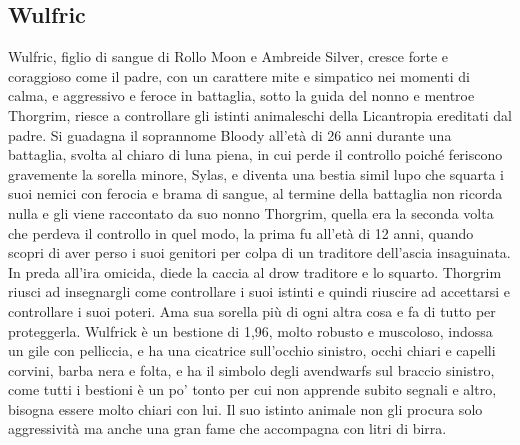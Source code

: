 \documentclass{article}
\begin{document}
          \subsection{Wulfric}
Wulfric, figlio di sangue  di Rollo Moon e Ambreide Silver, cresce forte e coraggioso come il padre, con un carattere mite e simpatico nei momenti di calma, e aggressivo e feroce in battaglia, sotto la guida del nonno e mentroe Thorgrim, riesce a controllare gli istinti animaleschi della Licantropia ereditati dal padre. Si guadagna il soprannome  Bloody all'età di 26 anni durante una battaglia, svolta al chiaro di luna piena, in cui perde il controllo poiché feriscono gravemente la sorella minore, Sylas,  e diventa una bestia simil lupo che squarta i suoi nemici con ferocia e brama di sangue, al termine della battaglia non ricorda nulla e gli viene raccontato da suo nonno Thorgrim, quella era la seconda volta che perdeva il controllo in quel modo, la prima fu all'età di 12 anni, quando scopri di aver perso i suoi genitori per colpa di un traditore dell'ascia insaguinata. In preda all'ira omicida, diede la caccia al drow traditore e lo squarto. Thorgrim riusci ad insegnargli come controllare i suoi istinti e quindi riuscire ad accettarsi e controllare i suoi poteri. Ama sua sorella più di ogni altra cosa e fa di tutto per proteggerla. Wulfrick è un bestione di 1,96, molto robusto e muscoloso, indossa un gile con pelliccia, e ha una cicatrice sull'occhio sinistro, occhi chiari e capelli corvini, barba nera e folta, e ha il simbolo degli avendwarfs sul braccio sinistro, come tutti i bestioni è un po' tonto per cui non apprende subito segnali e altro, bisogna essere molto chiari con lui. Il suo istinto animale non gli procura solo aggressività ma anche una gran fame che accompagna con litri di birra. 
\end{document}
